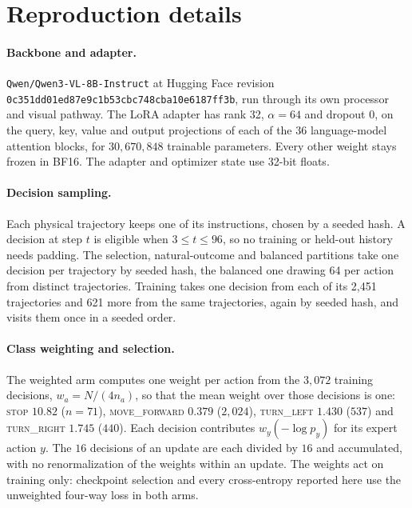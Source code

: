 \section{Reproduction details}
\label{app:repro}

\paragraph{Backbone and adapter.}
\texttt{Qwen/Qwen3-VL-8B-Instruct} at Hugging Face revision
\texttt{0c351dd01ed87e9c1b53cbc748cba10e6187ff3b}, run through its own processor and visual pathway.
The LoRA adapter has rank 32, $\alpha=64$ and dropout 0, on the query, key, value and output
projections of each of the 36 language-model attention blocks, for $30{,}670{,}848$ trainable parameters. Every other weight
stays frozen in BF16. The adapter and optimizer state use 32-bit floats.

\paragraph{Decision sampling.}
Each physical trajectory keeps one of its instructions, chosen by a seeded hash. A decision at step
$t$ is eligible when $3\le t\le 96$, so no training or held-out history needs padding. The
selection, natural-outcome and balanced partitions take one decision per trajectory by seeded hash,
the balanced one drawing 64 per action from distinct trajectories. Training takes one decision from
each of its 2,451 trajectories and 621 more from the same trajectories, again by seeded hash, and
visits them once in a seeded order.

\paragraph{Class weighting and selection.}
The weighted arm computes one weight per action from the $3{,}072$ training decisions,
$w_a = N/(4 n_a)$, so that the mean weight over those decisions is one: \textsc{stop} $10.82$
($n=71$), \textsc{move\_forward} $0.379$ ($2{,}024$), \textsc{turn\_left} $1.430$ ($537$) and
\textsc{turn\_right} $1.745$ ($440$). Each decision contributes $w_y(-\log p_y)$ for its expert action
$y$. The $16$ decisions of an update are each divided by $16$ and accumulated, with no
renormalization of the weights within an update. The weights act on training only: checkpoint
selection and every cross-entropy reported here use the unweighted four-way loss in both arms.

